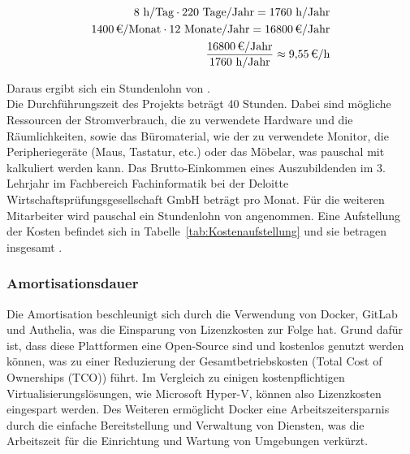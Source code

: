 \begin{eqnarray}
	8 \mbox{ h/Tag} \cdot 220 \mbox{ Tage/Jahr} = 1760 \mbox{ h/Jahr}\\
	\eur{1400}\mbox{/Monat} \cdot 12 \mbox{ Monate/Jahr} = \eur{16800} \mbox{/Jahr}\\
	\frac{\eur{16800} \mbox{/Jahr}}{1760 \mbox{ h/Jahr}} \approx \eur{9,55}\mbox{/h}
\end{eqnarray}

Daraus ergibt sich ein Stundenlohn von . 
\\Die Durchführungszeit des Projekts beträgt 40 Stunden. 
Dabei sind mögliche Ressourcen der Stromverbrauch, die zu verwendete Hardware und die Räumlichkeiten, sowie das Büromaterial, wie \zB der zu verwendete 
Monitor, die Peripheriegeräte (Maus, Tastatur, etc.) oder das Möbelar, was pauschal mit  kalkuliert werden kann. 
Das Brutto-Einkommen eines Auszubildenden im 3. Lehrjahr im Fachbereich Fachinformatik bei der Deloitte Wirtschaftsprüfungsgesellschaft GmbH 
beträgt  pro Monat. 
Für die weiteren Mitarbeiter wird pauschal ein Stundenlohn von  angenommen. 
Eine Aufstellung der Kosten befindet sich in Tabelle~\ref{tab:Kostenaufstellung} und sie betragen insgesamt .


\subsubsection{Amortisationsdauer}
\label{sec:Amortisationsdauer}
Die Amortisation beschleunigt sich durch die Verwendung von Docker, GitLab und Authelia, was die Einsparung von Lizenzkosten zur Folge hat. 
Grund dafür ist, dass diese Plattformen eine Open-Source sind und kostenlos genutzt werden können, was zu einer Reduzierung der  
Gesamtbetriebskosten (Total Cost of Ownerships (TCO)) führt. 
Im Vergleich zu einigen kostenpflichtigen Virtualisierungslösungen, wie \zB Microsoft Hyper-V, können also Lizenzkosten eingespart werden. 
Des Weiteren ermöglicht Docker eine Arbeitszeitersparnis durch die einfache Bereitstellung und Verwaltung von Diensten, was die Arbeitszeit für die 
Einrichtung und Wartung von Umgebungen verkürzt.


